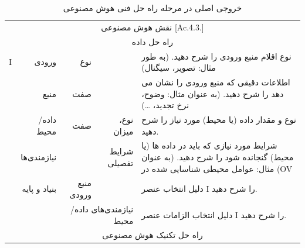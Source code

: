\documentclass[a4paper,10pt]{article}
\begin{document}
                    \begin{table}[htbp]

                        \centering
                        \caption{خروجی اصلی در مرحله راه حل فنی هوش مصنوعی}
                        \begin{tabularx}{\textwidth}{c c c c X}

                            \vspace{-10pt}\\

                            \hline

                            \multicolumn{5}{c}{نقش هوش مصنوعی [Ac.4.3.]}\\
                            
                            \hline

                            \multicolumn{5}{c}{راه حل داده}\\

                            \multicolumn{1}{c}{I} & \multicolumn{1}{r}{ورودی} & \multicolumn{1}{r}{نوع} &  & نوع اقلام منبع ورودی را شرح دهید. (به طور مثال: تصویر، سیگنال) \\
                            & \multicolumn{1}{r}{منبع} & \multicolumn{1}{r}{صفت} &  & اطلاعات دقیقی که منبع ورودی را نشان می دهد را شرح دهید. (به عنوان مثال: وضوح، نرخ تجدید، \dots) \\
                            & \multicolumn{1}{r}{داده/محیط} & \multicolumn{1}{r}{صفت} & \multicolumn{1}{r}{نوع، میزان} & نوع و مقدار داده (یا محیط) مورد نیاز را شرح دهید. \\
                            & \multicolumn{1}{r}{نیازمندی‌ها} &  & \multicolumn{1}{r}{شرایط تفصیلی} & شرایط مورد نیازی که باید در داده ها (یا محیط) گنجانده شود را شرح دهید. (به عنوان مثال: عوامل محیطی شناسایی شده در (OV \\
                            & \multicolumn{1}{r}{بنیاد و پایه} & \multicolumn{1}{r}{منبع ورودی} &  & دلیل انتخاب عنصر I را شرح دهید. \\
                            &  & \multicolumn{2}{r}{نیازمندی‌های داده/محیط} & دلیل انتخاب الزامات عنصر I را شرح دهید. \\

                            \multicolumn{5}{c}{راه حل تکنیک هوش مصنوعی}\\


\end{tabularx}
\end{table}
\end{document}
